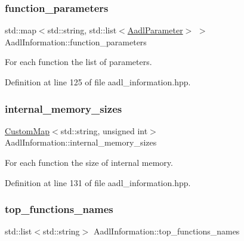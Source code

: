 \subsubsection{\texorpdfstring{function\+\_\+parameters}{function\_parameters}}
{\footnotesize\ttfamily std\+::map$<$std\+::string, std\+::list$<$\hyperlink{structAadlInformation_1_1AadlParameter}{Aadl\+Parameter}$>$ $>$ Aadl\+Information\+::function\+\_\+parameters}



For each function the list of parameters. 



Definition at line 125 of file aadl\+\_\+information.\+hpp.

\mbox{\label{classAadlInformation_a5d37d5428bd5ec42ff0988a030e1f964}} 
\subsubsection{\texorpdfstring{internal\+\_\+memory\+\_\+sizes}{internal\_memory\_sizes}}
{\footnotesize\ttfamily \hyperlink{custom__map_8hpp_a18ca01763abbe3e5623223bfe5aaac6b}{Custom\+Map}$<$std\+::string, unsigned int$>$ Aadl\+Information\+::internal\+\_\+memory\+\_\+sizes}



For each function the size of internal memory. 



Definition at line 131 of file aadl\+\_\+information.\+hpp.

\mbox{\label{classAadlInformation_a0fdd00ee4efacb6e9ff75022645321be}} 
\subsubsection{\texorpdfstring{top\+\_\+functions\+\_\+names}{top\_functions\_names}}
{\footnotesize\ttfamily std\+::list$<$std\+::string$>$ Aadl\+Information\+::top\+\_\+functions\+\_\+names}



